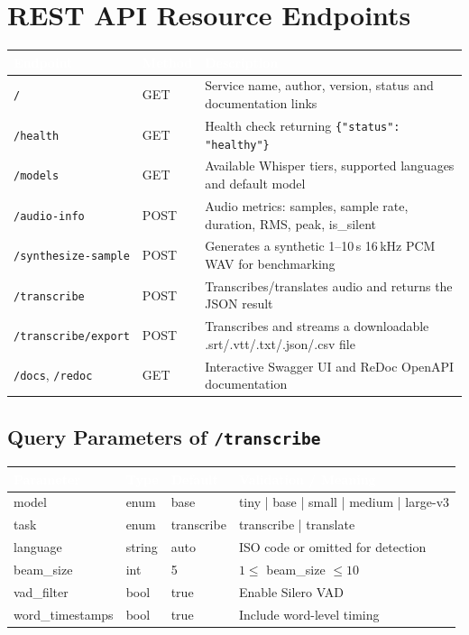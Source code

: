 \documentclass[11pt,a4paper]{article}
\newcommand{\thc}[1]{\textcolor{white}{\bfseries #1}}
\newcommand{\headrow}{\rowcolor{headblue}}
\begin{document}
\section{REST API Resource Endpoints}
\begin{tabularx}{\textwidth}{|L{3.6cm}|L{1.5cm}|Y|}
\hline
\headrow \thc{Endpoint} & \thc{Method} & \thc{Description} \\ \hline
\texttt{/} & GET & Service name, author, version, status and documentation links \\ \hline
\texttt{/health} & GET & Health check returning \texttt{\{"status": "healthy"\}} \\ \hline
\texttt{/models} & GET & Available Whisper tiers, supported languages and default model \\ \hline
\texttt{/audio-info} & POST & Audio metrics: samples, sample rate, duration, RMS, peak, is\_silent \\ \hline
\texttt{/synthesize-sample} & POST & Generates a synthetic 1--10\,s 16\,kHz PCM WAV for benchmarking \\ \hline
\texttt{/transcribe} & POST & Transcribes/translates audio and returns the JSON result \\ \hline
\texttt{/transcribe/export} & POST & Transcribes and streams a downloadable .srt/.vtt/.txt/.json/.csv file \\ \hline
\texttt{/docs}, \texttt{/redoc} & GET & Interactive Swagger UI and ReDoc OpenAPI documentation \\ \hline
\end{tabularx}

\subsection{Query Parameters of \texttt{/transcribe}}
\begin{tabularx}{\textwidth}{|L{3.2cm}|L{2.2cm}|L{2.2cm}|Y|}
\hline
\headrow \thc{Parameter} & \thc{Type} & \thc{Default} & \thc{Validation / Meaning} \\ \hline
model & enum & base & tiny | base | small | medium | large-v3 \\ \hline
task & enum & transcribe & transcribe | translate \\ \hline
language & string & auto & ISO code or omitted for detection \\ \hline
beam\_size & int & 5 & $1 \le$ beam\_size $\le 10$ \\ \hline
vad\_filter & bool & true & Enable Silero VAD \\ \hline
word\_timestamps & bool & true & Include word-level timing \\ \hline
\end{tabularx}
\end{document}
